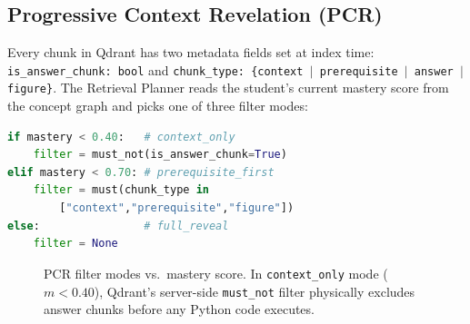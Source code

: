 \documentclass[11pt]{article}
\begin{document}
\subsection{Progressive Context Revelation (PCR)}
\label{sec:pcr}

Every chunk in Qdrant has two metadata fields set at index time:
\texttt{is\_answer\_chunk: bool} and
\texttt{chunk\_type: \{context $|$ prerequisite $|$ answer $|$ figure\}}.
The Retrieval Planner reads the student's current mastery score from the concept graph
and picks one of three filter modes:

\begin{lstlisting}[language=Python]
if mastery < 0.40:   # context_only
    filter = must_not(is_answer_chunk=True)
elif mastery < 0.70: # prerequisite_first
    filter = must(chunk_type in
        ["context","prerequisite","figure"])
else:                # full_reveal
    filter = None
\end{lstlisting}

\begin{figure}[ht]
\centering
{}
\caption{PCR filter modes vs.\ mastery score. In \texttt{context\_only} mode ($m<0.40$), Qdrant's server-side \texttt{must\_not} filter physically excludes answer chunks before any Python code executes.}
\label{fig:pcr}
\end{figure}
\end{document}
